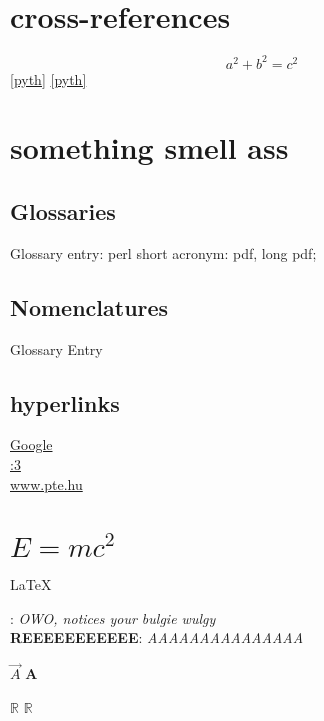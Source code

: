 \section{cross-references}
\begin{equation}
	a^2 + b^2 = c^2
	\label{pyth}
\end{equation}
\blindtext 
\ref{pyth} 
\pageref{pyth}
\eqref{pyth}
\blindtext {}
\blindtext

\section{something smell ass}
\blindtext
\subsection{Glossaries}
Glossary entry: \gls{perl} short acronym: \acrshort{pdf}, long \acrlong{pdf}; 

\subsection{Nomenclatures}
\hypertarget{gloentry}{Glossary Entry}

\subsection{hyperlinks}
\href{www.google.com}{Google}\\
\href{http://femboy.redirectme.net}{:3}\\
\url{www.pte.hu}

\section{\texorpdfstring{$E=mc^2$}{E=mc2}}
\LaTeX
\textbf{}

\newcommand{\mycum}[2]{\textbf{#1}: \textit{#2}}
\mycum{}{OWO, notices your bulgie wulgy}\\
\mycum{REEEEEEEEEEE}{AAAAAAAAAAAAAAA}

$\vec{A}$
\renewcommand{\vec}[1]{\mathbf{#1}}
$\vec{A}$

\newcommand*{\R}{\ensuremath{\mathbb{R}}}

$\R$
\R